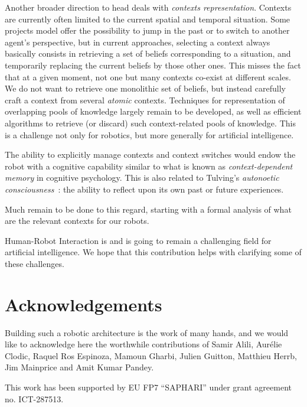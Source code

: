 \documentclass[preprint,3p,times]{elsarticle}
\begin{document}
Another broader direction to head deals with \emph{contexts representation}.
Contexts are currently often limited to the current spatial and temporal
situation. Some projects model offer the possibility to jump in the past or to
switch to another agent's perspective, but in current approaches, selecting a
context always basically consists in retrieving a set of beliefs corresponding
to a situation, and temporarily replacing the current beliefs by those other
ones. This misses the fact that at a given moment, not one but many contexts
co-exist at different scales. We do not want to retrieve one monolithic set of
beliefs, but instead carefully craft a context from several \emph{atomic}
contexts. Techniques for representation of overlapping pools of knowledge
largely remain to be developed, as well as efficient algorithms to retrieve (or
discard) such context-related pools of knowledge. This is a challenge not only
for robotics, but more generally for artificial intelligence.

The ability to explicitly manage contexts and context switches would endow the
robot with a cognitive capability similar to what is known as
\emph{context-dependent memory} in cognitive psychology. This is also related
to Tulving's \emph{autonoetic consciousness}~\cite{Tulving1985a}: the ability
to reflect upon its own past or future experiences.

Much remain to be done to this regard, starting with a formal analysis of what
are the relevant contexts for our robots.

Human-Robot Interaction is and is going to remain a challenging field for
artificial intelligence. We hope that this contribution helps with clarifying
some of these challenges.

\section*{Acknowledgements}

Building such a robotic architecture is the work of many hands, and we would
like to acknowledge here the worthwhile contributions of Samir Alili, Aurélie
Clodic, Raquel Ros Espinoza, Mamoun Gharbi, Julien Guitton, Matthieu Herrb, Jim
Mainprice and Amit Kumar Pandey.

This work has been supported by EU FP7 ``SAPHARI'' under grant agreement no.
ICT-287513.



%

\end{document}
